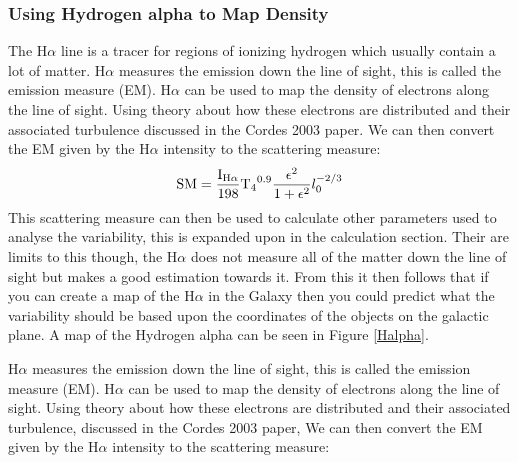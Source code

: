 \documentclass[a4paper, 10pt]{article}
\begin{document}
\subsubsection{Using Hydrogen alpha to Map Density}
The H$\alpha$ line is a tracer for regions of ionizing hydrogen which usually contain a lot of matter. H$\alpha$ measures the emission down the line of sight, this is called the emission measure (EM). H$\alpha$ can be used to map the density of electrons along the line of sight. Using theory about how these electrons are distributed and their associated turbulence discussed in the Cordes 2003 paper. We can then convert the EM given by the H$\alpha$ intensity to  the scattering measure:
\[ \ce{SM}= \frac{\ce{I_{H\alpha}}}{198} \ce{T_4^{0.9}} \frac{\epsilon^2}{1+\epsilon^2}l_0^{-2/3} \]
This scattering measure can then be used to calculate other parameters used to analyse the variability, this is expanded upon in the calculation section. Their are limits to this though, the H$\alpha$ does not measure all of the matter down the line of sight but makes a good estimation towards it. From this it then follows that if you can create a map of the H$\alpha$ in the Galaxy then you could predict what the variability should be based upon the coordinates of the objects on the galactic plane. A map of the Hydrogen alpha can be seen in Figure \ref{Halpha}. 


H$\alpha$ measures the emission down the line of sight, this is called the emission measure (EM). H$\alpha$ can be used to map the density of electrons along the line of sight. Using theory about how these electrons are distributed and their associated turbulence, discussed in the Cordes 2003 paper, We can then convert the EM given by the H$\alpha$ intensity to the scattering measure:

\end{document}
